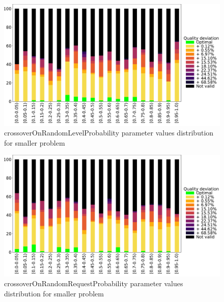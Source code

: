 \begin{figure}
	\centering
	\includegraphics[width=\textwidth]{images/DistrObj/crossoverOnRandomLevelProbability.pdf}
	\caption[crossoverOnRandomLevelProbability parameter values distribution for smaller problem]{crossoverOnRandomLevelProbability parameter values distribution for smaller problem}
	\label{fig:crossoverOnRandomLevelProbability_Obj}
\end{figure}
\begin{figure}
	\centering
	\includegraphics[width=\textwidth]{images/DistrObj/crossoverOnRandomRequestProbability.pdf}
	\caption[crossoverOnRandomRequestProbability parameter values distribution for smaller problem]{crossoverOnRandomRequestProbability parameter values distribution for smaller problem}       
	\label{fig:crossoverOnRandomRequestProbability_Obj}
\end{figure}
